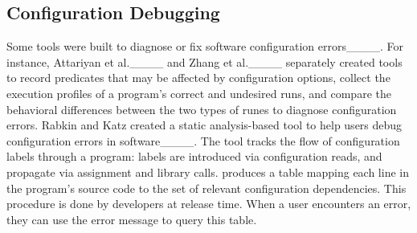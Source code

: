 

  \vspace{-.5em}
\subsection{Configuration Debugging}
Some tools were built to diagnose or fix software configuration errors____. 
For instance, Attariyan et al.____ and Zhang et al.____ separately created tools to record predicates that may be affected by configuration options, collect the execution profiles of a program's correct and undesired runs, and compare the behavioral differences between the two types of runes to diagnose configuration errors. 
Rabkin and Katz created a static analysis-based tool to help users debug configuration errors in software____. 
The tool tracks the flow of configuration labels through a program: labels are introduced via configuration reads, and propagate via assignment and library calls. %
\tool produces a table mapping each line in the program's source code to the set of relevant configuration dependencies. This procedure is done by developers at release time. When a user encounters an error, they can use the error message to query this table. 
 
